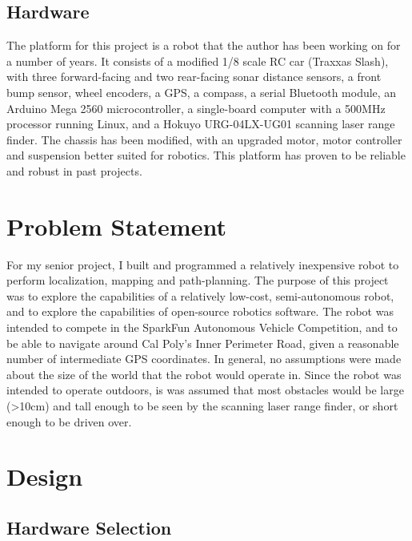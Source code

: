 \documentclass[a4paper,12pt]{article}
\begin{document}
\subsection{Hardware}
The platform for this project is a robot that the author has been working on for a number of years. It consists of a modified 1/8 scale RC car (Traxxas Slash\cite{traxxas}), with three forward-facing and two rear-facing sonar distance sensors, a front bump sensor, wheel encoders, a GPS, a compass, a serial Bluetooth module, an Arduino Mega 2560 microcontroller, a single-board computer with a 500MHz processor running Linux, and a Hokuyo URG-04LX-UG01 scanning laser range finder. The chassis has been modified, with an upgraded motor, motor controller and suspension better suited for robotics. This platform has proven to be reliable and robust in past projects.

\section{Problem Statement}
For my senior project, I built and programmed a relatively inexpensive robot to perform localization, mapping and path-planning. The purpose of this project was to explore the capabilities of a relatively low-cost, semi-autonomous robot, and to explore the capabilities of open-source robotics software. The robot was intended to compete in the SparkFun Autonomous Vehicle Competition\cite{avc}, and to be able to navigate around Cal Poly's Inner Perimeter Road, given a reasonable number of intermediate GPS coordinates. In general, no assumptions were made about the size of the world that the robot would operate in. Since the robot was intended to operate outdoors, is was assumed that most obstacles would be large (>10cm) and tall enough to be seen by the scanning laser range finder, or short enough to be driven over.

\section{Design}
\subsection{Hardware Selection}

\end{document}
